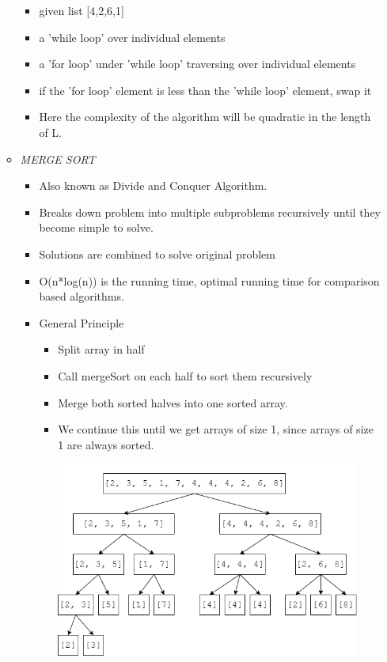\documentclass[11pt]{article}
\begin{document}
\begin{enumerate}
\begin{itemize}
\begin{itemize}
                \item given list [4,2,6,1]
                \item a 'while loop' over individual elements
                \item a 'for loop' under 'while loop' traversing over individual elements
                \item if the 'for loop' element is less than the 'while loop' element, swap it
                \item Here the complexity of the algorithm will be quadratic in the length of L.
            \end{itemize}
            \item \textit{MERGE SORT}
            \begin{itemize}
                \item Also known as Divide and Conquer Algorithm.
                \item Breaks down problem into multiple subproblems recursively until they become simple to solve.
                \item Solutions are combined to solve original problem
                \item O(n*log(n)) is the running time, optimal running time for comparison based algorithms.
                \item General Principle
                \begin{itemize}
                    \item Split array in half
                    \item Call mergeSort on each half to sort them recursively
                    \item Merge both sorted halves into one sorted array. 
                    \item We continue this until we get arrays of size 1, since arrays of size 1 are always sorted.
                    
                    \includegraphics[width=10cm]{07-MergeSort2.drawio.png}


\end{itemize}
\end{itemize}
\end{itemize}
\end{enumerate}
\end{document}
